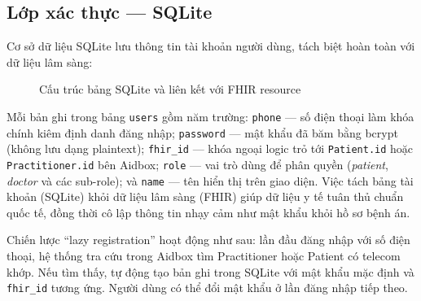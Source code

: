 \documentclass[a4paper,13pt,3p,twoside,openany]{report}
\theoremstyle{definition}
\theoremstyle{remark}
\theoremstyle{definition}
\let\ORIGsubsection\subsection
\renewcommand{\subsection}{\needspace{3\baselineskip}\ORIGsubsection}
\begin{document}
\subsection{Lớp xác thực --- SQLite}

Cơ sở dữ liệu SQLite lưu thông tin tài khoản người dùng, tách biệt hoàn toàn với dữ liệu lâm sàng:

\begin{figure}[H]
\centering
{}
\caption{Cấu trúc bảng SQLite và liên kết với FHIR resource}
\label{fig:er-sqlite}
\end{figure}

Mỗi bản ghi trong bảng \texttt{users} gồm năm trường: \texttt{phone} --- số điện thoại làm khóa chính kiêm định danh đăng nhập; \texttt{password} --- mật khẩu đã băm bằng bcrypt (không lưu dạng plaintext); \texttt{fhir\_id} --- khóa ngoại logic trỏ tới \texttt{Patient.id} hoặc \texttt{Practitioner.id} bên Aidbox; \texttt{role} --- vai trò dùng để phân quyền (\textit{patient}, \textit{doctor} và các sub-role); và \texttt{name} --- tên hiển thị trên giao diện. Việc tách bảng tài khoản (SQLite) khỏi dữ liệu lâm sàng (FHIR) giúp dữ liệu y tế tuân thủ chuẩn quốc tế, đồng thời cô lập thông tin nhạy cảm như mật khẩu khỏi hồ sơ bệnh án.

Chiến lược ``lazy registration'' hoạt động như sau: lần đầu đăng nhập với số điện thoại, hệ thống tra cứu trong Aidbox tìm Practitioner hoặc Patient có telecom khớp. Nếu tìm thấy, tự động tạo bản ghi trong SQLite với mật khẩu mặc định và \texttt{fhir\_id} tương ứng. Người dùng có thể đổi mật khẩu ở lần đăng nhập tiếp theo.
\end{document}

